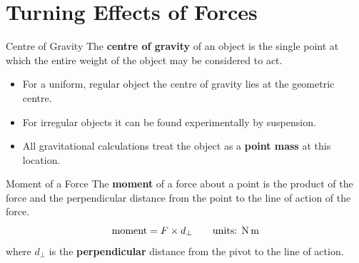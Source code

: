 

\section{Turning Effects of Forces}

\begin{definitionbox}{Centre of Gravity}
The \textbf{centre of gravity} of an object is the single point at which the entire weight of the object may be considered to act.
\begin{itemize}[itemsep=2pt]
  \item For a uniform, regular object the centre of gravity lies at the geometric centre.
  \item For irregular objects it can be found experimentally by suspension.
  \item All gravitational calculations treat the object as a \textbf{point mass} at this location.
\end{itemize}
\end{definitionbox}

\begin{definitionbox}{Moment of a Force}
The \textbf{moment} of a force about a point is the product of the force and the perpendicular distance from the point to the line of action of the force.
$$\text{moment} = F \times d_\perp \qquad \text{units: N\,m}$$
where $d_\perp$ is the \textbf{perpendicular} distance from the pivot to the line of action.
\end{definitionbox}

